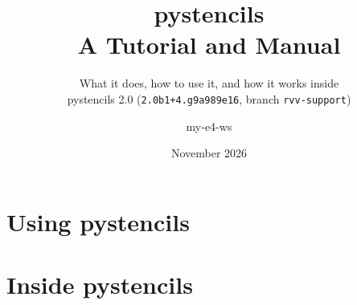 \documentclass[11pt,a4paper,oneside,parskip=half,open=any,
  toc=bibliography,toc=listof,numbers=noenddot]{scrreprt}
\title{pystencils\\[0.3em]\Large A Tutorial and Manual}
\subtitle{What it does, how to use it, and how it works inside\\
  {\normalsize pystencils 2.0 (\texttt{2.0b1+4.g9a989e16}, branch \texttt{rvv-support})}}
\author{my-e4-ws}
\date{November 2026}
\begin{document}
\maketitle
\tableofcontents

\part{Using pystencils}






\part{Inside pystencils}








\appendix






\printbibliography[heading=bibintoc]
\listoffigures
\lstlistoflistings
\end{document}
